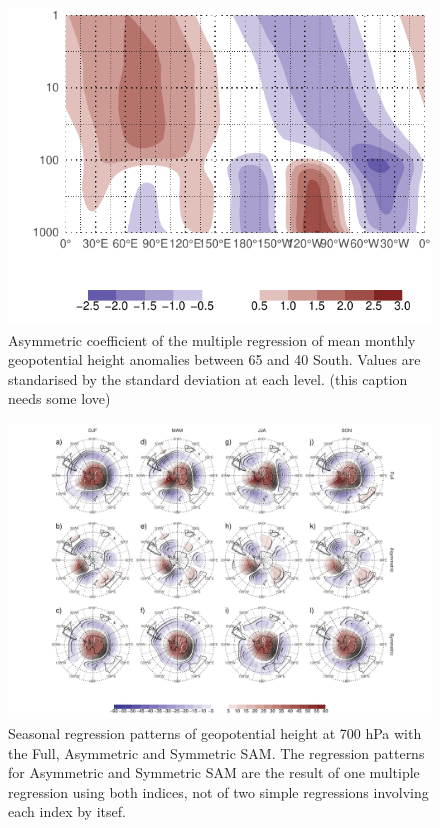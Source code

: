 \documentclass[]{ametsocV5}
\begin{document}
\begin{figure}
\includegraphics{vertical-regression-1} \caption[Asymmetric coefficient of the multiple regression of mean monthly geopotential height anomalies between 65 and 40 South]{Asymmetric coefficient of the multiple regression of mean monthly geopotential height anomalies between 65 and 40 South. Values are standarised by the standard deviation at each level. (this caption needs some love)}\label{fig:vertical-regression}
\end{figure}

\begin{figure}
\includegraphics{2d-regr-700-1} \caption[Seasonal regression patterns of geopotential height at 700 hPa with the Full, Asymmetric and Symmetric SAM]{Seasonal regression patterns of geopotential height at 700 hPa with the Full, Asymmetric and Symmetric SAM. The regression patterns for Asymmetric and Symmetric SAM are the result of one multiple regression using both indices, not of two simple regressions involving each index by itsef.}\label{fig:2d-regr-700}
\end{figure}
\end{document}
